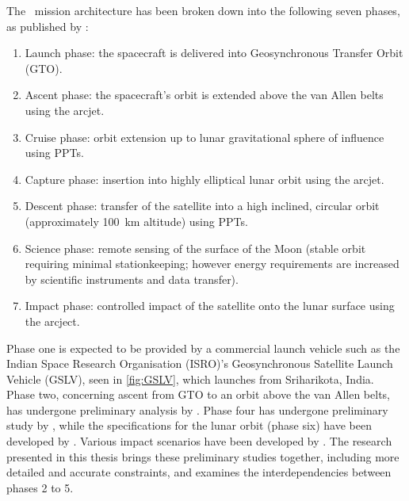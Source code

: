 The \BW\ mission architecture has been broken down into the following seven phases, as published by \textcite{web_BW-1}:
\begin{enumerate}
  \item Launch phase: the spacecraft is delivered into Geosynchronous Transfer Orbit (GTO).
  \item Ascent phase: the spacecraft's orbit is extended above the van Allen belts using the arcjet.
  \item Cruise phase: orbit extension up to lunar gravitational sphere of influence using PPTs.
  \item Capture phase: insertion into highly elliptical lunar orbit using the arcjet.
  \item Descent phase: transfer of the satellite into a high inclined, circular orbit (approximately 100~km altitude) using PPTs.
  \item Science phase: remote sensing of the surface of the Moon (stable orbit requiring minimal stationkeeping; however energy requirements are increased by scientific instruments and data transfer).
  \item Impact phase: controlled impact of the satellite onto the lunar surface using the arcject.
\end{enumerate}
Phase one is expected to be provided by a commercial launch vehicle such as the Indian Space Research Organisation (ISRO)'s Geosynchronous Satellite Launch Vehicle (GSLV), seen in \autoref{fig:GSLV}, which launches from Sriharikota, India. Phase two, concerning ascent from GTO to an orbit above the van Allen belts, has undergone preliminary analysis by \textcite{Letterio_thesis}. Phase four has undergone preliminary study by \textcite{Moellman2005}, while the specifications for the lunar orbit (phase six) have been developed by \textcite{Zeile2010}. Various impact scenarios have been developed by \textcite{Trawny2004}. The research presented in this thesis brings these preliminary studies together, including more detailed and accurate constraints, and examines the interdependencies between phases 2 to 5.

